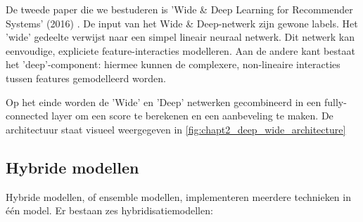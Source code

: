 
De tweede paper die we bestuderen is 'Wide \& Deep Learning for Recommender Systems' (2016) \cite{wide_deep_learning_paper}. De input van het Wide \& Deep-netwerk zijn gewone labels. Het 'wide' gedeelte verwijst naar een simpel lineair neuraal netwerk. Dit netwerk kan eenvoudige, expliciete feature-interacties modelleren. Aan de andere kant bestaat het 'deep'-component: hiermee kunnen de complexere, non-lineaire interacties tussen features gemodelleerd worden. 

Op het einde worden de 'Wide' en 'Deep' netwerken gecombineerd in een fully-connected layer om een score te berekenen en een aanbeveling te maken. De architectuur staat visueel weergegeven in \autoref{fig:chapt2_deep_wide_architecture}


\subsection{Hybride modellen}
\label{sec:chapt2_hybride_modellen}

Hybride modellen, of ensemble modellen, implementeren meerdere technieken in één model. Er bestaan zes hybridisatiemodellen:

